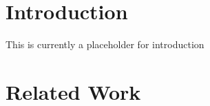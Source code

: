 \documentclass[sigconf]{acmart}
\begin{document}

\maketitle

\section{Introduction}


This is currently a placeholder for introduction

\section{Related Work}
\end{document}
